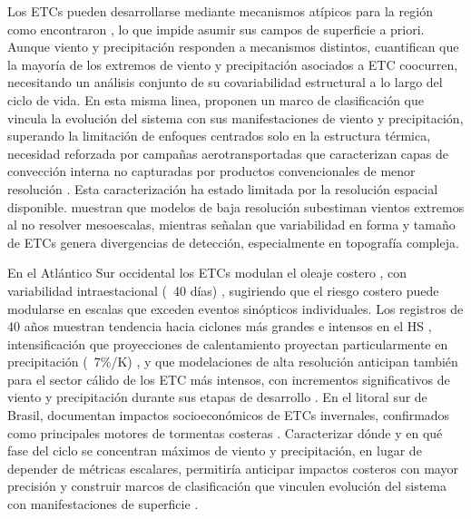 Los ETCs pueden desarrollarse mediante mecanismos atípicos para la región como encontraron \citet{gozzo2013air,reboita2022from}, lo que impide asumir sus campos de superficie a priori.
Aunque viento y precipitación responden a mecanismos distintos, \citet{chen2025characteristics} cuantifican que la mayoría de los extremos de viento y precipitación asociados a ETC coocurren, necesitando un análisis conjunto de su covariabilidad estructural a lo largo del ciclo de vida.
En esta misma linea, \citet{han2025system} proponen un marco de clasificación que vincula la evolución del sistema con sus manifestaciones de viento y precipitación, superando la limitación de enfoques centrados solo en la estructura térmica, necesidad reforzada por campañas aerotransportadas que caracterizan capas de convección interna no capturadas por productos convencionales de menor resolución \citep{kaylee2025convection}.
Esta caracterización ha estado limitada por la resolución espacial disponible. \citet{priestley2022improved} muestran que modelos de baja resolución subestiman vientos extremos al no resolver mesoescalas, mientras \citet{neu2013intercomparison} señalan que variabilidad en forma y tamaño de ETCs genera divergencias de detección, especialmente en topografía compleja.

En el Atlántico Sur occidental los ETCs modulan el oleaje costero \citep{gramcianinov2023impact}, con variabilidad intraestacional (~40 días) \citep{sasaki2021intraseasonal}, sugiriendo que el riesgo costero puede modularse en escalas que exceden eventos sinópticos individuales.
Los registros de 40 años muestran tendencia hacia ciclones más grandes e intensos en el HS \citep{simmonds2000variability}, intensificación que proyecciones de calentamiento proyectan particularmente en precipitación (~7\%/K) \citep{kodama2019perspective}, y que modelaciones de alta resolución anticipan también para el sector cálido de los ETC más intensos, con incrementos significativos de viento y precipitación durante sus etapas de desarrollo \citep{gentile2025response}.
En el litoral sur de Brasil, \citet{bartolomei2024extremos} documentan impactos socioeconómicos de ETCs invernales, confirmados como principales motores de tormentas costeras \citep{miranda2026patterns,bitencourt2010relating}.
Caracterizar dónde y en qué fase del ciclo se concentran máximos de viento y precipitación, en lugar de depender de métricas escalares, permitiría anticipar impactos costeros con mayor precisión y construir marcos de clasificación que vinculen evolución del sistema con manifestaciones de superficie \citep{han2025system}.

